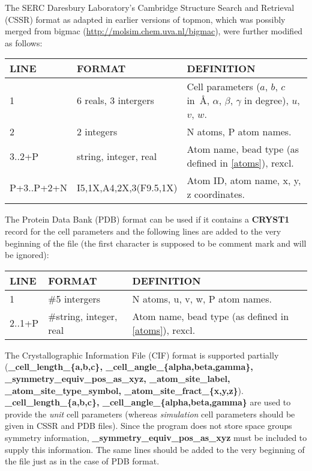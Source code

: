 \documentclass[12pt,letterpaper]{article}
\begin{document}
The SERC Daresbury Laboratory's Cambridge Structure Search
and Retrieval (CSSR) format as adapted in earlier versions
of topmon, which was possibly merged from bigmac
(\url{http://molsim.chem.uva.nl/bigmac}), were further
modified as follows:
\begin{table}[h!]
\begin{tabular}{|l|l|l|}
\hline
LINE       & FORMAT                 & DEFINITION\\ \hline
1          & 6 reals, 3 intergers   & Cell parameters ($a$, $b$, $c$ in~\AA, $\alpha$, $\beta$, $\gamma$ in degree), $u$, $v$, $w$.\\ \hline
2          & 2 integers             & N atoms, P atom names.\\ \hline
3..2+P     & string, integer, real  & Atom name, bead type (as defined in \ref{atoms}), rexcl.\\ \hline
P+3..P+2+N & I5,1X,A4,2X,3(F9.5,1X) & Atom ID, atom name, x, y, z coordinates.\\ \hline
\end{tabular}
\end{table}

The Protein Data Bank (PDB) format can be used if it
contains a \textbf{CRYST1} record for the cell parameters
and the following lines are added to the very beginning of
the file (the first character is supposed to be comment mark
and will be ignored):
\begin{table}[h!]
\begin{tabular}{|l|l|l|}
\hline
LINE   & FORMAT                 & DEFINITION\\ \hline
1      & \#5 intergers           & N atoms, u, v, w, P atom names.\\ \hline
2..1+P & \#string, integer, real & Atom name, bead type (as defined in \ref{atoms}), rexcl.\\ \hline
\end{tabular}
\end{table}

The Crystallographic Information File (CIF) format is
supported partially (\textbf{\_cell\_length\_\{a,b,c\},
  \_cell\_angle\_\{alpha,beta,gamma\},
  \_symmetry\_equiv\_pos\_as\_xyz, \_atom\_site\_label,
  \_atom\_site\_type\_symbol,
  \_atom\_site\_fract\_\{x,y,z\}}).
\textbf{\_cell\_length\_\{a,b,c\},
  \_cell\_angle\_\{alpha,beta,gamma\}} are used to provide
the \textit{unit} cell parameters (whereas
\textit{simulation} cell parameters should be given in CSSR
and PDB files). Since the program does not store space
groups symmetry information,
\textbf{\_symmetry\_equiv\_pos\_as\_xyz} must be included to
supply this information. The same lines should be added to
the very beginning of the file just as in the case of PDB
format.
\end{document}
